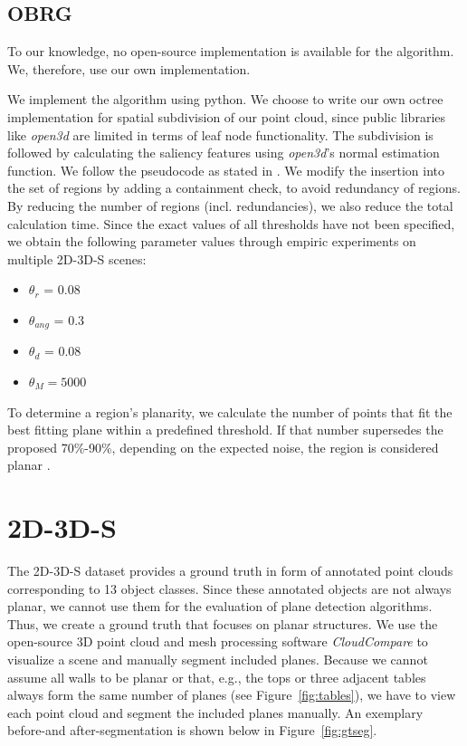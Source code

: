 \documentclass[main.tex]{subfiles}
\begin{document}
\subsection{OBRG}
\label{sec:impl-obrg}
To our knowledge, no open-source implementation is available for the algorithm.
We, therefore, use our own implementation.

We implement the algorithm using python. We choose to write our own octree implementation for spatial subdivision of our point cloud, since
public libraries like \textit{open3d} are limited in terms of leaf node functionality.
The subdivision is followed by calculating the saliency features using \textit{open3d}'s normal estimation function.
We follow the pseudocode as stated in \cite[Algorithm~1]{Vo_Truong-Hong_Laefer_Bertolotto_2015}. We modify the insertion into the set
of regions by adding a containment check, to avoid redundancy of regions. By reducing the number of regions (incl. redundancies), we also
reduce the total calculation time.
Since the exact values of all thresholds have not been specified, we obtain the following parameter values
through empiric experiments on multiple 2D-3D-S scenes: 
\begin{itemize}
    \item $\theta_r$ = 0.08
    \item $\theta_{ang}$ = 0.3
    \item $\theta_d$ =  0.08
    \item $\theta_M = 5000$
\end{itemize}

To determine a region's planarity, we calculate the number of points that fit the best fitting plane within a predefined threshold.
If that number supersedes the proposed 70\%-90\%, depending on the expected noise, the region is considered planar \cite[Section~3.4]{Vo_Truong-Hong_Laefer_Bertolotto_2015}.




\section{2D-3D-S}
\label{sec:gtseg}
The 2D-3D-S dataset provides a ground truth in form of annotated point clouds corresponding to 13 object classes. Since these annotated objects are not
always planar, we cannot use them for the evaluation of plane detection algorithms. Thus, we create a ground truth that focuses on planar structures.
We use the open-source 3D point cloud and mesh processing software \textit{CloudCompare} to visualize a scene and manually segment included planes.
Because we cannot assume all walls to be planar or that, e.g., the tops or three adjacent tables always form the same number of planes (see Figure~\ref{fig:tables}), we
have to view each point cloud and segment the included planes manually. An exemplary before-and after-segmentation is shown below in Figure~\ref{fig:gtseg}.
\end{document}

